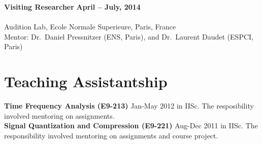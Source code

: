 \documentclass[line]{resume}
\begin{document}
{\begin{resume}
    \textbf{Visiting Researcher} \hfill \textbf{ April -- July, 2014}\vspace{-3mm}\\\vspace{-1mm}\\%
    Audition Lab, Ecole Normale Superieure, Paris, France \vspace{0mm}\\%
    Mentor: Dr.~Daniel Pressnitzer (ENS, Paris), and Dr.~Laurent Daudet (ESPCI, Paris)\vspace{-6mm}\\

\vspace{-1.5mm}
    \section{\mysidestyle Teaching Assistantship}
    \vspace{1mm}
       \textbf{Time Frequency Analysis (E9-213)} Jan-May 2012 in IISc. The resposibility involved mentoring on assignments.\vspace{1mm}\\%
       \textbf{Signal Quantization and Compression (E9-221)} Aug-Dec 2011 in IISc. The responsibility involved mentoring on
       assignments and course project.\vspace{1mm}
    \vspace{-1.5mm}

\end{resume}}
\end{document}
